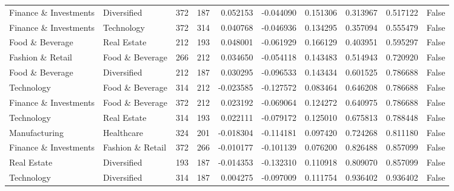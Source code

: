 \begin{tabular}{llrrrrrrrr}
Finance \& Investments & Diversified & 372 & 187 & 0.052153 & -0.044090 & 0.151306 & 0.313967 & 0.517122 & False \\
Finance \& Investments & Technology & 372 & 314 & 0.040768 & -0.046936 & 0.134295 & 0.357094 & 0.555479 & False \\
Food \& Beverage & Real Estate & 212 & 193 & 0.048001 & -0.061929 & 0.166129 & 0.403951 & 0.595297 & False \\
Fashion \& Retail & Food \& Beverage & 266 & 212 & 0.034650 & -0.054118 & 0.143483 & 0.514943 & 0.720920 & False \\
Food \& Beverage & Diversified & 212 & 187 & 0.030295 & -0.096533 & 0.143434 & 0.601525 & 0.786688 & False \\
Technology & Food \& Beverage & 314 & 212 & -0.023585 & -0.127572 & 0.083464 & 0.646208 & 0.786688 & False \\
Finance \& Investments & Food \& Beverage & 372 & 212 & 0.023192 & -0.069064 & 0.124272 & 0.640975 & 0.786688 & False \\
Technology & Real Estate & 314 & 193 & 0.022111 & -0.079172 & 0.125010 & 0.675813 & 0.788448 & False \\
Manufacturing & Healthcare & 324 & 201 & -0.018304 & -0.114181 & 0.097420 & 0.724268 & 0.811180 & False \\
Finance \& Investments & Fashion \& Retail & 372 & 266 & -0.010177 & -0.101139 & 0.076200 & 0.826488 & 0.857099 & False \\
Real Estate & Diversified & 193 & 187 & -0.014353 & -0.132310 & 0.110918 & 0.809070 & 0.857099 & False \\
Technology & Diversified & 314 & 187 & 0.004275 & -0.097009 & 0.111754 & 0.936402 & 0.936402 & False \\
\bottomrule
\end{tabular}
